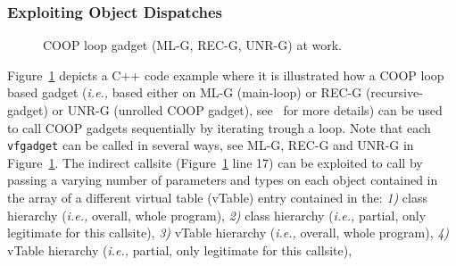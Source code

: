 \subsubsection{Exploiting Object Dispatches}
\label{Exploiting Polymorphism Weaknesses}
 \begin{figure}[!h]
   \vspace{-.37cm}
   \centering
\vspace{-2.6cm}
\caption{COOP loop gadget (ML-G, REC-G, UNR-G) at work.}
\label{Code example used to illustrate how a COOP loop gadget works}
\end{figure}
Figure~\ref{Code example used to illustrate how a COOP loop gadget works}
depicts a C++ code example where it is illustrated how a COOP loop based gadget 
(\textit{i.e.,} based either on ML-G (main-loop) or REC-G (recursive-gadget) or UNR-G (unrolled COOP gadget), 
see~\cite{crane:readactor++} for more details) can be used to call COOP gadgets sequentially by iterating trough a loop.
Note that each \texttt{vfgadget}  can be called in several ways, see ML-G, REC-G and UNR-G in 
Figure~\ref{Code example used to illustrate how a COOP loop gadget works}.
The indirect callsite (Figure~\ref{Code example used to illustrate how a COOP loop gadget works} line 17) can be exploited 
to call by passing a varying number of parameters and types on each object contained in the array of a different
virtual table (vTable) entry contained in the:
\textit{1)} class hierarchy (\textit{i.e.,} overall, whole program),
\textit{2)} class hierarchy (\textit{i.e.,} partial, only legitimate for this callsite),
\textit{3)} vTable hierarchy (\textit{i.e.,} overall, whole program),
\textit{4)} vTable hierarchy (\textit{i.e.,} partial, only legitimate for this callsite),
